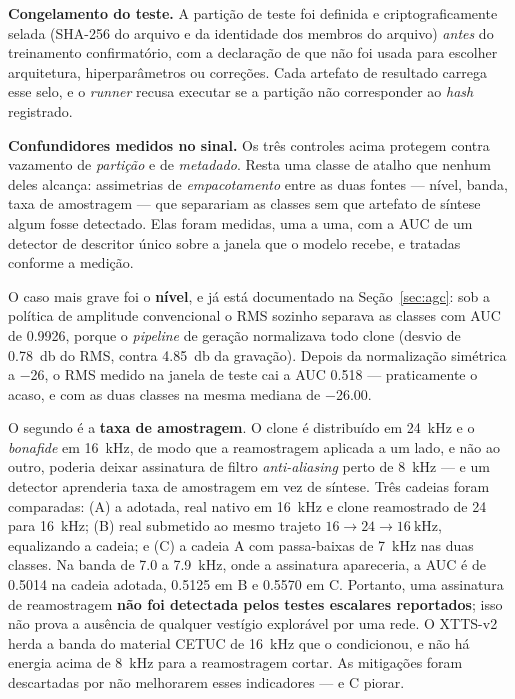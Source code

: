 \documentclass[12pt,a4paper]{article}
\begin{document}
\textbf{Congelamento do teste.} A partição de teste foi definida e
criptograficamente selada (SHA-256 do arquivo e da identidade dos membros do
arquivo) \emph{antes} do treinamento confirmatório, com a declaração de que não
foi usada para escolher arquitetura, hiperparâmetros ou correções. Cada
artefato de resultado carrega esse selo, e o \textit{runner} recusa executar se
a partição não corresponder ao \textit{hash} registrado.

\textbf{Confundidores medidos no sinal.} Os três controles acima protegem
contra vazamento de \emph{partição} e de \emph{metadado}. Resta uma classe de
atalho que nenhum deles alcança: assimetrias de \emph{empacotamento} entre as
duas fontes --- nível, banda, taxa de amostragem --- que separariam as classes
sem que artefato de síntese algum fosse detectado. Elas foram medidas, uma a
uma, com a AUC de um detector de descritor único sobre a janela que o modelo
recebe, e tratadas conforme a medição.

O caso mais grave foi o \textbf{nível}, e já está documentado na
Seção~\ref{sec:agc}: sob a política de amplitude convencional o RMS sozinho
separava as classes com AUC de \num{0,9926}, porque o \textit{pipeline} de
geração normalizava todo clone (desvio de \SI{0,78}{\decibel} do RMS, contra
\SI{4,85}{\decibel} da gravação). Depois da normalização simétrica a
\SI{-26}{\dBFS}, o RMS medido na janela de teste cai a AUC \num{0,518} ---
praticamente o acaso, e com as duas classes na mesma mediana de
\SI{-26,00}{\dBFS}.

O segundo é a \textbf{taxa de amostragem}. O clone é distribuído em
\SI{24}{\kilo\hertz} e o \textit{bonafide} em \SI{16}{\kilo\hertz}, de modo que
a reamostragem aplicada a um lado, e não ao outro, poderia deixar assinatura de
filtro \textit{anti-aliasing} perto de \SI{8}{\kilo\hertz} --- e um detector
aprenderia taxa de amostragem em vez de síntese. Três cadeias foram comparadas:
(A) a adotada, real nativo em \SI{16}{\kilo\hertz} e clone reamostrado de
\num{24} para \SI{16}{\kilo\hertz}; (B) real submetido ao mesmo trajeto
$16 \rightarrow 24 \rightarrow \SI{16}{\kilo\hertz}$, equalizando a cadeia; e
(C) a cadeia A com passa-baixas de \SI{7}{\kilo\hertz} nas duas classes. Na
banda de \num{7,0} a \SI{7,9}{\kilo\hertz}, onde a assinatura apareceria, a AUC
é de \num{0,5014} na cadeia adotada, \num{0,5125} em B e \num{0,5570} em C.
Portanto, uma assinatura de reamostragem \textbf{não foi detectada pelos testes
	escalares reportados}; isso não prova a ausência de qualquer vestígio explorável
por uma rede. O XTTS-v2 herda a banda do material CETUC de
\SI{16}{\kilo\hertz} que o condicionou, e não há energia acima de
\SI{8}{\kilo\hertz} para a reamostragem cortar. As mitigações foram descartadas
por não melhorarem esses indicadores --- e C piorar.
\end{document}
